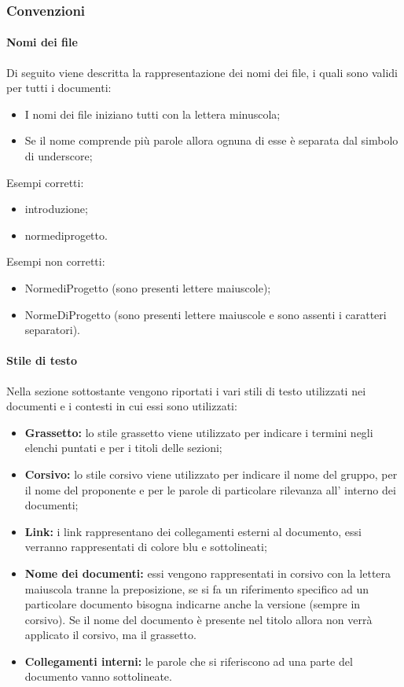 \subsubsection{Convenzioni}
\paragraph{Nomi dei file}
Di seguito viene descritta la rappresentazione dei nomi dei file, i quali sono validi per tutti i documenti:
\begin{itemize}
    \item I nomi dei file iniziano tutti con la lettera minuscola;
    \item Se il nome comprende più parole allora ognuna di esse è separata dal simbolo di underscore;
\end {itemize}
Esempi corretti:
\begin{itemize}
    \item introduzione;
    \item norme\textunderscore di\textunderscore progetto.
\end {itemize}
Esempi non corretti:
\begin{itemize}
    \item Norme\textunderscore di\textunderscore Progetto (sono presenti lettere maiuscole);
    \item NormeDiProgetto (sono presenti lettere maiuscole e sono assenti i caratteri separatori).
\end {itemize}

\paragraph{Stile di testo}
Nella sezione sottostante vengono riportati i vari stili di testo utilizzati nei documenti e i contesti in cui essi sono utilizzati:
\begin {itemize}
    \item \textbf{Grassetto:} lo stile grassetto viene utilizzato per indicare i termini negli elenchi puntati e per i titoli delle sezioni;
    \item \textbf{Corsivo:} lo stile corsivo viene utilizzato per indicare il nome del gruppo, per il nome del proponente e per le parole di particolare rilevanza all' interno dei documenti;
    \item \textbf{Link:} i link rappresentano dei collegamenti esterni al documento, essi verranno rappresentati di colore blu e sottolineati;
    \item \textbf{Nome dei documenti:} essi vengono rappresentati in corsivo con la lettera maiuscola tranne la preposizione, se si fa un riferimento specifico ad un particolare documento bisogna indicarne anche la versione (sempre in corsivo).
    Se il nome del documento è presente nel titolo allora non verrà applicato il corsivo, ma il grassetto.
    \item \textbf{Collegamenti interni:} le parole che si riferiscono ad una parte del documento vanno sottolineate.
\end {itemize}
